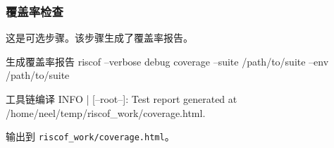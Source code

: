 \documentclass[xcolor=table,dvipsnames,svgnames,aspectratio=169]{ctexbeamer}
\begin{document}
\begin{frame}
  \frametitle{覆盖率检查}

  这是可选步骤。该步骤生成了覆盖率报告。

  \begin{codeblock}[language=bash]{生成覆盖率报告}
riscof --verbose debug coverage --suite /path/to/suite --env /path/to/suite
  \end{codeblock}

  \begin{codeblock}[language=bash]{工具链编译}
INFO | [--root--]: Test report generated at /home/neel/temp/riscof_work/coverage.html.
  \end{codeblock}

  输出到 \lstinline|riscof_work/coverage.html|。
\end{frame}
\end{document}
